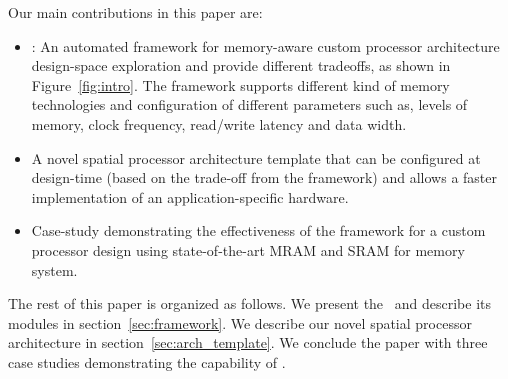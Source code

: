 Our main contributions in this paper are:
\begin{itemize}
\item \frameworkname: An automated framework for memory-aware custom processor architecture design-space exploration and provide different tradeoffs, as shown in Figure~\ref{fig:intro}. The framework supports different kind of memory technologies and configuration of different parameters such as, levels of memory, clock frequency, read/write latency and data width. 
\item A novel spatial processor architecture template that can be configured at design-time (based on the trade-off from the framework) and allows a faster implementation of an application-specific hardware.
\item Case-study demonstrating the effectiveness of the framework for a custom processor design using state-of-the-art MRAM and SRAM for memory system.




\end{itemize}


The rest of this paper is organized as follows. We present the \frameworkname~and describe its modules in section~\ref{sec:framework}. We describe our novel spatial processor architecture in section~\ref{sec:arch_template}. We conclude the paper with three case studies demonstrating the capability of \frameworkname.

